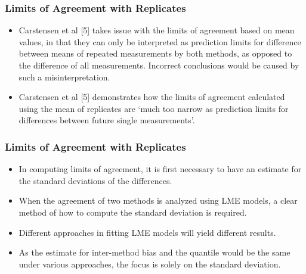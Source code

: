 \documentclass[compress]{beamer}        %
\begin{document}
\begin{frame}
\frametitle{Limits of Agreement with Replicates}
\begin{itemize}
\item Carstensen et al [5] takes issue with the limits of agreement based on
mean values, in that they can only be interpreted as prediction
limits for difference between means of repeated measurements by
both methods, as opposed to the difference of all measurements.
Incorrect conclusions would be caused by such a misinterpretation.
\item Carstensen et al [5] demonstrates how the limits of agreement
calculated using the mean of replicates are `much too narrow as
prediction limits for differences between future single
measurements'. 
\end{itemize}
\end{frame}
\begin{frame}
\frametitle{Limits of Agreement with Replicates}
\begin{itemize}

\item In computing limits of agreement, it is first necessary to have an estimate for the standard deviations of the differences. 
\item When the agreement of two methods is analyzed using LME models, a clear method of how to compute the standard deviation is required. 
\item Different approaches in fitting LME models will yield different results.
\item As the estimate for inter-method bias and the quantile would be the same under various approaches, the focus is solely on the standard deviation.
\end{itemize}
\end{frame}
\end{document}
